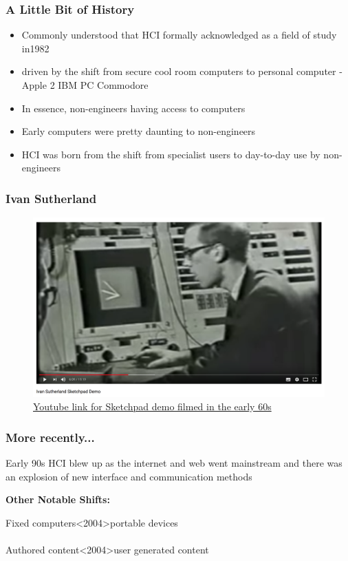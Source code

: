 \begin{frame}
	\frametitle{A Little Bit of History}
	\begin{itemize}
		\item Commonly understood that HCI formally acknowledged as a field of study in1982
		\item driven by the shift from secure cool room computers to personal computer - Apple 2 IBM PC Commodore
		\item In essence, non-engineers having access to computers
		\item Early computers were pretty daunting to non-engineers
		\item HCI was born from the shift from specialist users to day-to-day use by non-engineers
	\end{itemize}
\end{frame}

\begin{frame}
	\frametitle{Ivan Sutherland}
	\begin{figure}
		\includegraphics[scale=.2]{assets/sutherland}
		\caption{\href{https://youtu.be/6orsmFndx_o?t=655}{Youtube link for Sketchpad demo filmed in the early 60s}}
	\end{figure}
\end{frame}

\begin{frame}
	\frametitle{More recently...}
	\begin{center}
		Early 90s HCI blew up as the internet and web went mainstream and there was an explosion of new interface and communication methods
	\end{center}
	\textbf{Other Notable Shifts: }
	
	\begin{center}
		Fixed computers\textless 2004\textgreater  portable devices \\ ~ \\
                    Authored content\textless 2004\textgreater  user generated content
         \end{center}
\end{frame}

